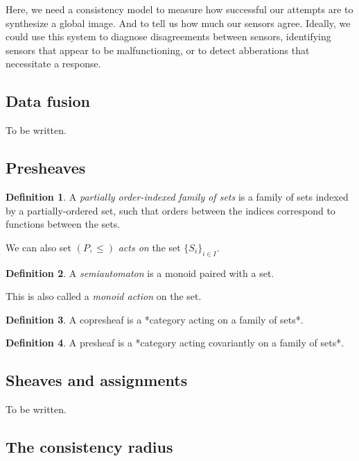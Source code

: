 \documentclass[]             %
{NASA}                       %
\theoremstyle{definition}
\newtheorem{definition}{Definition}[section]
\begin{document}
Here, we need a consistency model to measure how successful our attempts
are to synthesize a global image. And to tell us how much our sensors
agree. Ideally, we could use this system to diagnose disagreements
between sensors, identifying sensors that appear to be malfunctioning,
or to detect abberations that necessitate a response.

\hypertarget{data-fusion}{%
\subsection{Data fusion}\label{data-fusion}}

To be written.

\hypertarget{presheaves}{%
\subsection{Presheaves}\label{presheaves}}

\begin{definition}
A \emph{partially order-indexed family of sets} is a family of sets indexed by a partially-ordered set,
such that orders between the indices correspond to functions between the sets.
\end{definition}

We can also set \((P, \leq)\) \emph{acts on} the set
\(\{S_i\}_{i \in I}\).

\begin{definition}
A \emph{semiautomaton} is a monoid paired with a set.
\end{definition}

This is also called a \emph{monoid action} on the set.

\begin{definition}
A copresheaf is a *category acting on a family of sets*.
\end{definition}

\begin{definition}
A presheaf is a *category acting covariantly on a family of sets*.
\end{definition}

\hypertarget{sheaves-and-assignments}{%
\subsection{Sheaves and assignments}\label{sheaves-and-assignments}}

To be written.

\hypertarget{the-consistency-radius}{%
\subsection{The consistency radius}\label{the-consistency-radius}}
\end{document}
